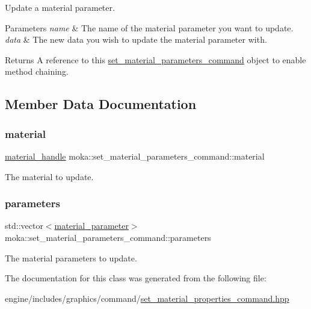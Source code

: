 Update a material parameter. 


\begin{DoxyParams}{Parameters}
{\em name} & The name of the material parameter you want to update. \\
\hline
{\em data} & The new data you wish to update the material parameter with. \\
\hline
\end{DoxyParams}
\begin{DoxyReturn}{Returns}
A reference to this \mbox{\hyperlink{classmoka_1_1set__material__parameters__command}{set\+\_\+material\+\_\+parameters\+\_\+command}} object to enable method chaining. 
\end{DoxyReturn}


\subsection{Member Data Documentation}
\mbox{\label{classmoka_1_1set__material__parameters__command_a1a5d8a86c457fc4d2c0033270bd3fa64}} 
\subsubsection{\texorpdfstring{material}{material}}
{\footnotesize\ttfamily \mbox{\hyperlink{structmoka_1_1material__handle}{material\+\_\+handle}} moka\+::set\+\_\+material\+\_\+parameters\+\_\+command\+::material}

The material to update. \mbox{\label{classmoka_1_1set__material__parameters__command_ae1ec908f405a367b43e799b62d749616}} 
\subsubsection{\texorpdfstring{parameters}{parameters}}
{\footnotesize\ttfamily std\+::vector$<$\mbox{\hyperlink{structmoka_1_1material__parameter}{material\+\_\+parameter}}$>$ moka\+::set\+\_\+material\+\_\+parameters\+\_\+command\+::parameters}

The material parameters to update. 

The documentation for this class was generated from the following file\+:\begin{DoxyCompactItemize}
\item 
engine/includes/graphics/command/\mbox{\hyperlink{set__material__properties__command_8hpp}{set\+\_\+material\+\_\+properties\+\_\+command.\+hpp}}\end{DoxyCompactItemize}
